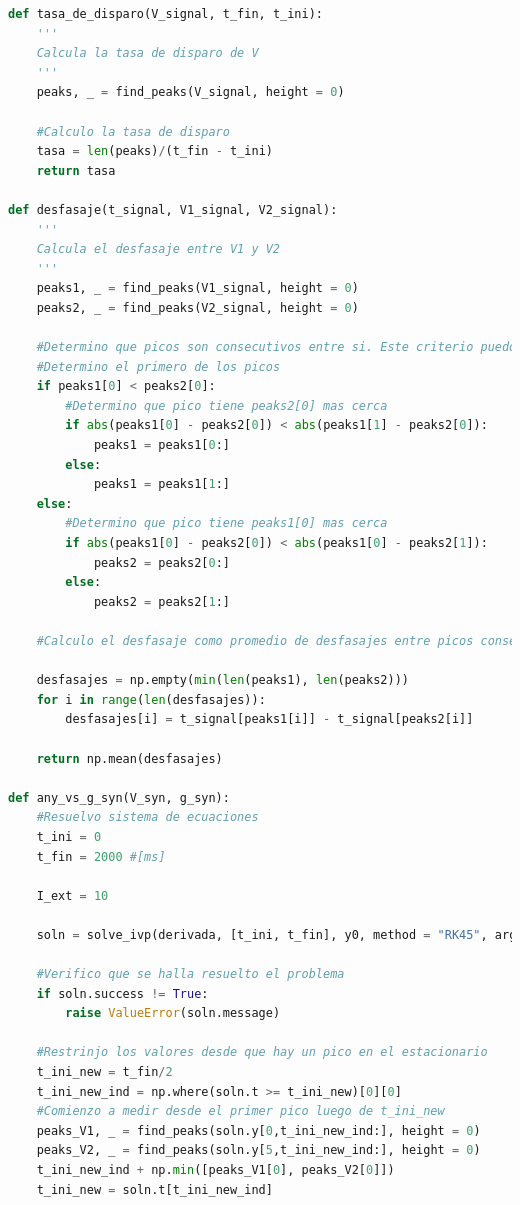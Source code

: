 \documentclass[aps,prb,twocolumn,superscriptaddress,floatfix,longbibliography]{revtex4-2}
\begin{document}
\begin{lstlisting}[language=Python]
def tasa_de_disparo(V_signal, t_fin, t_ini):
    '''
    Calcula la tasa de disparo de V
    '''
    peaks, _ = find_peaks(V_signal, height = 0)
    
    #Calculo la tasa de disparo
    tasa = len(peaks)/(t_fin - t_ini)
    return tasa

def desfasaje(t_signal, V1_signal, V2_signal):
    '''
    Calcula el desfasaje entre V1 y V2
    '''
    peaks1, _ = find_peaks(V1_signal, height = 0)
    peaks2, _ = find_peaks(V2_signal, height = 0)
    
    #Determino que picos son consecutivos entre si. Este criterio puedo aplicarlo porque ya conozco como se comporta el problema
    #Determino el primero de los picos
    if peaks1[0] < peaks2[0]:
        #Determino que pico tiene peaks2[0] mas cerca
        if abs(peaks1[0] - peaks2[0]) < abs(peaks1[1] - peaks2[0]):
            peaks1 = peaks1[0:]
        else:
            peaks1 = peaks1[1:]
    else:
        #Determino que pico tiene peaks1[0] mas cerca
        if abs(peaks1[0] - peaks2[0]) < abs(peaks1[0] - peaks2[1]):
            peaks2 = peaks2[0:]
        else:
            peaks2 = peaks2[1:]

    #Calculo el desfasaje como promedio de desfasajes entre picos consecutivos

    desfasajes = np.empty(min(len(peaks1), len(peaks2)))
    for i in range(len(desfasajes)):
        desfasajes[i] = t_signal[peaks1[i]] - t_signal[peaks2[i]]
    
    return np.mean(desfasajes)

def any_vs_g_syn(V_syn, g_syn):
    #Resuelvo sistema de ecuaciones
    t_ini = 0
    t_fin = 2000 #[ms]

    I_ext = 10

    soln = solve_ivp(derivada, [t_ini, t_fin], y0, method = "RK45", args = (I_ext,g_syn,V_syn), dense_output = True)

    #Verifico que se halla resuelto el problema
    if soln.success != True:
        raise ValueError(soln.message)

    #Restrinjo los valores desde que hay un pico en el estacionario
    t_ini_new = t_fin/2
    t_ini_new_ind = np.where(soln.t >= t_ini_new)[0][0]
    #Comienzo a medir desde el primer pico luego de t_ini_new
    peaks_V1, _ = find_peaks(soln.y[0,t_ini_new_ind:], height = 0)
    peaks_V2, _ = find_peaks(soln.y[5,t_ini_new_ind:], height = 0)
    t_ini_new_ind + np.min([peaks_V1[0], peaks_V2[0]])
    t_ini_new = soln.t[t_ini_new_ind]


\end{lstlisting}
\end{document}
